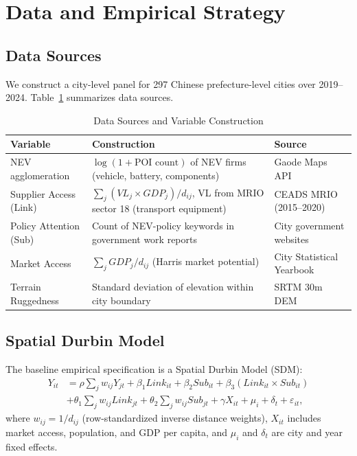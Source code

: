 \documentclass[11pt,a4paper]{article}
\begin{document}
\section{Data and Empirical Strategy}

\subsection{Data Sources}

We construct a city-level panel for 297 Chinese prefecture-level cities over 2019--2024. Table~\ref{tab:data_sources} summarizes data sources.

\begin{table}[H]
\centering
\caption{Data Sources and Variable Construction}
\label{tab:data_sources}
\begin{tabular}{l p{6cm} l}
\toprule
\textbf{Variable} & \textbf{Construction} & \textbf{Source} \\
\midrule
NEV agglomeration & $\log(1 + \text{POI count})$ of NEV firms (vehicle, battery, components) & Gaode Maps API \\
Supplier Access (Link) & $\sum_j (VL_j \times GDP_j) / d_{ij}$, VL from MRIO sector 18 (transport equipment) & CEADS MRIO (2015--2020) \\
Policy Attention (Sub) & Count of NEV-policy keywords in government work reports & City government websites \\
Market Access & $\sum_j GDP_j / d_{ij}$ (Harris market potential) & City Statistical Yearbook \\
Terrain Ruggedness & Standard deviation of elevation within city boundary & SRTM 30m DEM \\
\bottomrule
\end{tabular}
\end{table}

\subsection{Spatial Durbin Model}

The baseline empirical specification is a Spatial Durbin Model (SDM):
\begin{equation}\label{eq:sdm}
\begin{aligned}
Y_{it} &= \rho \sum_j w_{ij} Y_{jt}
        + \beta_1 Link_{it} + \beta_2 Sub_{it} + \beta_3 (Link_{it} \times Sub_{it}) \\
       &+ \theta_1 \sum_j w_{ij} Link_{jt}
        + \theta_2 \sum_j w_{ij} Sub_{jt}
        + \gamma X_{it} + \mu_i + \delta_t + \varepsilon_{it},
\end{aligned}
\end{equation}
where $w_{ij} = 1/d_{ij}$ (row-standardized inverse distance weights), $X_{it}$ includes market access, population, and GDP per capita, and $\mu_i$ and $\delta_t$ are city and year fixed effects.
\end{document}
